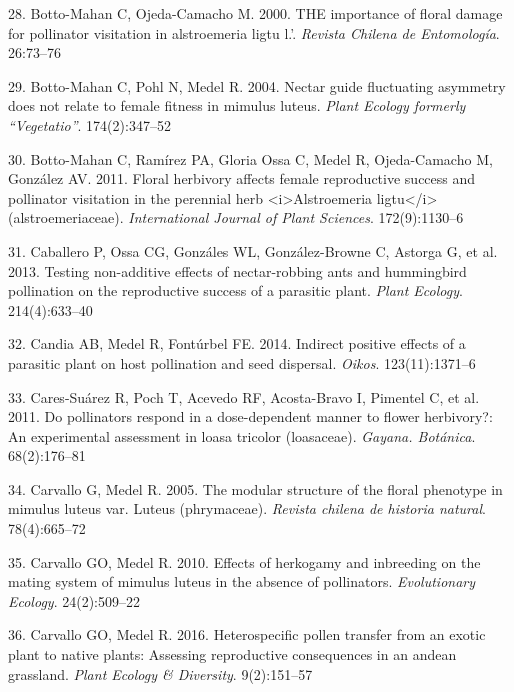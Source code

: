 \documentclass[
]{article}
\begin{document}
\leavevmode\hypertarget{ref-RN107}{}%
28. Botto-Mahan C, Ojeda-Camacho M. 2000. THE importance of floral
damage for pollinator visitation in alstroemeria ligtu l.'.
\emph{Revista Chilena de Entomología}. 26:73--76

\leavevmode\hypertarget{ref-RN108}{}%
29. Botto-Mahan C, Pohl N, Medel R. 2004. Nectar guide fluctuating
asymmetry does not relate to female fitness in mimulus luteus.
\emph{Plant Ecology formerly ``Vegetatio''}. 174(2):347--52

\leavevmode\hypertarget{ref-RN109}{}%
30. Botto-Mahan C, Ramírez PA, Gloria Ossa C, Medel R, Ojeda-Camacho M,
González AV. 2011. Floral herbivory affects female reproductive success
and pollinator visitation in the perennial herb
\textless i\textgreater Alstroemeria ligtu\textless/i\textgreater{}
(alstroemeriaceae). \emph{International Journal of Plant Sciences}.
172(9):1130--6

\leavevmode\hypertarget{ref-RN110}{}%
31. Caballero P, Ossa CG, Gonzáles WL, González-Browne C, Astorga G, et
al. 2013. Testing non-additive effects of nectar-robbing ants and
hummingbird pollination on the reproductive success of a parasitic
plant. \emph{Plant Ecology}. 214(4):633--40

\leavevmode\hypertarget{ref-RN22}{}%
32. Candia AB, Medel R, Fontúrbel FE. 2014. Indirect positive effects of
a parasitic plant on host pollination and seed dispersal. \emph{Oikos}.
123(11):1371--6

\leavevmode\hypertarget{ref-RN111}{}%
33. Cares-Suárez R, Poch T, Acevedo RF, Acosta-Bravo I, Pimentel C, et
al. 2011. Do pollinators respond in a dose-dependent manner to flower
herbivory?: An experimental assessment in loasa tricolor (loasaceae).
\emph{Gayana. Botánica}. 68(2):176--81

\leavevmode\hypertarget{ref-RN112}{}%
34. Carvallo G, Medel R. 2005. The modular structure of the floral
phenotype in mimulus luteus var. Luteus (phrymaceae). \emph{Revista
chilena de historia natural}. 78(4):665--72

\leavevmode\hypertarget{ref-RN113}{}%
35. Carvallo GO, Medel R. 2010. Effects of herkogamy and inbreeding on
the mating system of mimulus luteus in the absence of pollinators.
\emph{Evolutionary Ecology}. 24(2):509--22

\leavevmode\hypertarget{ref-RN114}{}%
36. Carvallo GO, Medel R. 2016. Heterospecific pollen transfer from an
exotic plant to native plants: Assessing reproductive consequences in an
andean grassland. \emph{Plant Ecology \& Diversity}. 9(2):151--57
\end{document}
